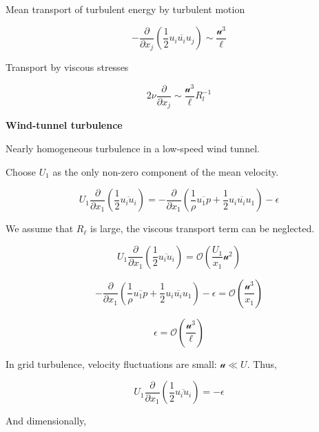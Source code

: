\documentclass{article}
\begin{document}
Mean transport of turbulent energy by turbulent motion

\begin{equation*}
    -\frac{\partial}{\partial x_j}\left(\frac{1}{2}\overline{u_iu_iu_j}\right)\sim\frac{\mathcal{u}^3}{\ell}
\end{equation*}

Transport by viscous stresses

\begin{equation*}
    2\nu\frac{\partial}{\partial x_j}\sim\frac{\mathcal{u}^3}{\ell}R_l^{-1}
\end{equation*}

\textbf{Wind-tunnel turbulence}

Nearly homogeneous turbulence in a low-speed wind tunnel.

Choose $U_1$ as the only non-zero component of the mean velocity.

\begin{equation*}
    U_1\frac{\partial}{\partial x_1}\left(\frac{1}{2}\overline{u_iu_i}\right)=-\frac{\partial}{\partial x_1}\left(\frac{1}{\rho}\overline{u_1p}+\frac{1}{2}\overline{u_iu_iu_1}\right)-\epsilon
\end{equation*}

We assume that $R_\ell$ is large, the viscous transport term can be neglected.

\begin{equation*}
    U_1\frac{\partial}{\partial x_1}\left(\frac{1}{2}\overline{u_iu_i}\right)=\mathcal{O}\left(\frac{U_1}{x_1}\mathcal{u}^2\right)
\end{equation*}

\begin{equation*}
    -\frac{\partial}{\partial x_1}\left(\frac{1}{\rho}\overline{u_1p}+\frac{1}{2}\overline{u_iu_iu_1}\right)-\epsilon=\mathcal{O}\left(\frac{\mathcal{u}^3}{x_1}\right)
\end{equation*}

\begin{equation*}
    \epsilon=\mathcal{O}\left(\frac{\mathcal{u}^3}{\ell}\right)
\end{equation*}

In grid turbulence, velocity fluctuations are small: $\mathcal{u}\ll U$. Thus,

\begin{equation*}
    U_1\frac{\partial}{\partial x_1}\left(\frac{1}{2}\overline{u_iu_i}\right)=-\epsilon
\end{equation*}

And dimensionally,
\end{document}
